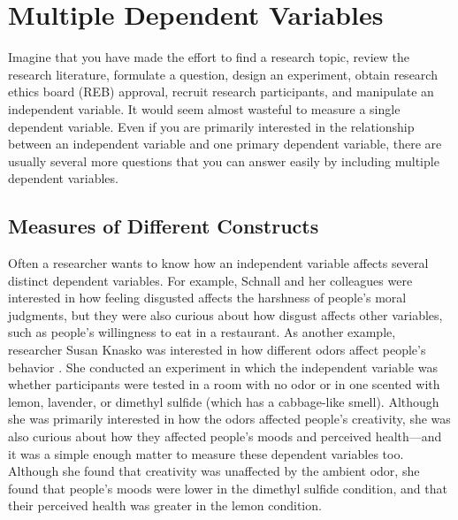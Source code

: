\section{Multiple Dependent Variables}


Imagine that you have made the effort to find a research topic, review the research literature, formulate a question, design an experiment, obtain research ethics board (REB) approval, recruit research participants, and manipulate an independent variable. It would seem almost wasteful to measure a single dependent variable. Even if you are primarily interested in the relationship between an independent variable and one primary dependent variable, there are usually several more questions that you can answer easily by including multiple dependent variables.

\subsection{Measures of Different Constructs}

Often a researcher wants to know how an independent variable affects several distinct dependent variables. For example, Schnall and her colleagues were interested in how feeling disgusted affects the harshness of people's moral judgments, but they were also curious about how disgust affects other variables, such as people's willingness to eat in a restaurant. As another example, researcher Susan Knasko was interested in how different odors affect people's behavior \citep{knasko_ambient_1992}. She conducted an experiment in which the independent variable was whether participants were tested in a room with no odor or in one scented with lemon, lavender, or dimethyl sulfide (which has a cabbage-like smell). Although she was primarily interested in how the odors affected people's creativity, she was also curious about how they affected people's moods and perceived health---and it was a simple enough matter to measure these dependent variables too. Although she found that creativity was unaffected by the ambient odor, she found that people's moods were lower in the dimethyl sulfide condition, and that their perceived health was greater in the lemon condition.

